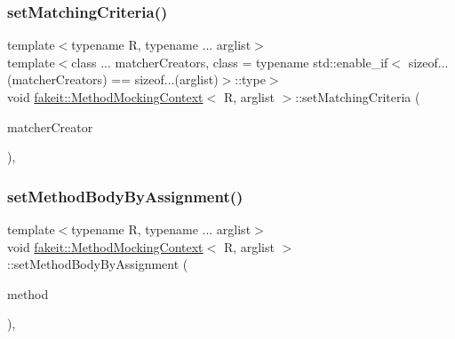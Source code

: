 \mbox{\label{classfakeit_1_1MethodMockingContext_ab6bf85e9f9f5e5eeb2766ec487a42e20}} 
\subsubsection{\texorpdfstring{setMatchingCriteria()}{setMatchingCriteria()}\hspace{0.1cm}{\footnotesize\ttfamily [27/27]}}
{\footnotesize\ttfamily template$<$typename R, typename ... arglist$>$ \\
template$<$class ... matcher\+Creators, class  = typename std\+::enable\+\_\+if$<$                sizeof...(matcher\+Creators) == sizeof...(arglist)$>$\+::type$>$ \\
void \mbox{\hyperlink{classfakeit_1_1MethodMockingContext}{fakeit\+::\+Method\+Mocking\+Context}}$<$ R, arglist $>$\+::set\+Matching\+Criteria (\begin{DoxyParamCaption}\item[{const matcher\+Creators \&...}]{matcher\+Creator }\end{DoxyParamCaption})\hspace{0.3cm}{\ttfamily [inline]}, {\ttfamily [protected]}}

\mbox{\label{classfakeit_1_1MethodMockingContext_ade0a1e36946f68957ee3717147122c4d}} 
\subsubsection{\texorpdfstring{setMethodBodyByAssignment()}{setMethodBodyByAssignment()}\hspace{0.1cm}{\footnotesize\ttfamily [1/9]}}
{\footnotesize\ttfamily template$<$typename R, typename ... arglist$>$ \\
void \mbox{\hyperlink{classfakeit_1_1MethodMockingContext}{fakeit\+::\+Method\+Mocking\+Context}}$<$ R, arglist $>$\+::set\+Method\+Body\+By\+Assignment (\begin{DoxyParamCaption}\item[{std\+::function$<$ R(const typename \mbox{\hyperlink{structfakeit_1_1test__arg}{fakeit\+::test\+\_\+arg}}$<$ arglist $>$\+::type...)$>$}]{method }\end{DoxyParamCaption})\hspace{0.3cm}{\ttfamily [inline]}, {\ttfamily [protected]}}

